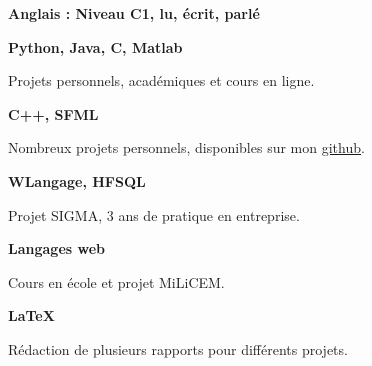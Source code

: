 \textbf{Anglais : Niveau C1, lu, \'ecrit, parl\'e}

\medskip

\textbf{Python, Java, C, Matlab}

Projets personnels, acad\'emiques et cours en ligne.

\medskip

\textbf{C++, SFML}

Nombreux projets personnels, disponibles sur mon \href{https://github.com/ThomasRanvier}{github}.

\medskip

\textbf{WLangage, HFSQL}

Projet SIGMA, 3 ans de pratique en entreprise.

\medskip

\textbf{Langages web}

Cours en \'ecole et projet MiLiCEM.

\medskip

\textbf{\LaTeX}

R\'edaction de plusieurs rapports pour diff\'erents projets.

\medskip
